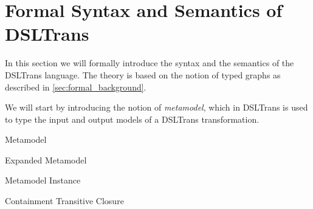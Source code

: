 \section{Formal Syntax and Semantics of DSLTrans}
\label{sec:DSLTrans_formal_appendix}

\setcounter{definition}{0}
\setcounter{subsection}{0}

\onehalfspacing 

In this section we will formally introduce the syntax and the semantics of the DSLTrans language. The theory is based on the notion of typed graphs as described in \cref{sec:formal_background}.

We will start by introducing the notion of \emph{metamodel}, which in DSLTrans is used to type the input and output models of a DSLTrans transformation. 

\begin{definition}{Metamodel}
\label{def:metamodel_appendix}


\end{definition}


\begin{definition}{Expanded Metamodel}
\label{def:expanded_metamodel_appendix}


\end{definition}


\begin{definition}{Metamodel Instance}
\label{def:instance_appendix}


\end{definition}




\begin{definition}{Containment Transitive Closure}
\label{def:instance_closure_appendix}


\end{definition}

